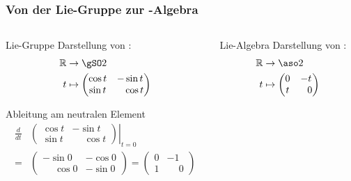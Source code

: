 %
%
%
\bgroup

\begin{frame}[t]
\setlength{\abovedisplayskip}{5pt}
\setlength{\belowdisplayskip}{5pt}
\frametitle{Von der Lie-Gruppe zur -Algebra}
\vspace{-20pt}
\begin{columns}[t,onlytextwidth]
\begin{column}{0.48\textwidth}
  \begin{block}{Lie-Gruppe}
    Darstellung von :
    \begin{align*}
      \mathbb R 
      &\to 
      \gSO2
      \\
      t
      &\mapsto
      \begin{pmatrix}
        \cos t &         -\sin t \\ 
        \sin t & \phantom-\cos t
      \end{pmatrix}
    \end{align*}
  \end{block}
  \begin{block}{Ableitung am neutralen Element}
    \begin{align*}
    \frac{d}{d t}
    &
    \left.
    \begin{pmatrix}
      \cos t &         -\sin t \\ 
      \sin t & \phantom-\cos t
    \end{pmatrix}
    \right|_{ t = 0}
    \\
    =
    & 
    \begin{pmatrix} -\sin0 & -\cos0 \\ \phantom-\cos0 & -\sin0 \end{pmatrix}
    = 
    \begin{pmatrix} 0 & -1 \\ 1 &  \phantom-0 \end{pmatrix}
    \end{align*}
  \end{block}
\end{column}
\begin{column}{0.48\textwidth}
  \begin{block}{Lie-Algebra}
    Darstellung von :
    \begin{align*}
      \mathbb R 
      &\to 
      \aso2
      \\
      t
      &\mapsto
      \begin{pmatrix}
        0 &         -t \\ 
        t & \phantom-0
      \end{pmatrix}
    \end{align*}
  \end{block}
\end{column}
\end{columns}
\end{frame}


